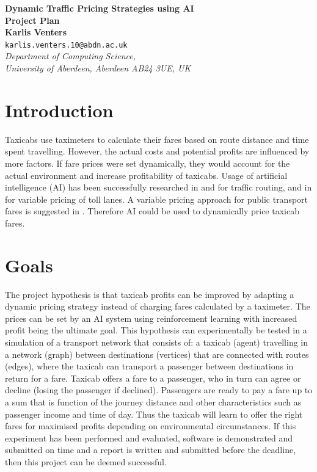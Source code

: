 \documentclass[a4paper,12pt]{article}
\begin{document}
\begin{center}
{\Large\bf{Dynamic Traffic Pricing Strategies using AI}} \\
      \vspace{4.0mm}
{\Large\bf{Project Plan}} \\
      \vspace{6mm}
      {\large\bf{Karlis Venters}}  \\
      \vspace{4.0mm}
       {\tt karlis.venters.10@abdn.ac.uk} \\
      \vspace{4.0mm}
      {\em Department of Computing Science,\\
       University of Aberdeen, Aberdeen AB24 3UE, UK} 
\end{center}


\section*{Introduction}
Taxicabs use taximeters to calculate their fares based on route distance and time spent travelling. However, the actual costs and potential profits are influenced by more factors. If fare prices were set dynamically, they would account for the actual environment and increase profitability of taxicabs. Usage of artificial intelligence (AI) has been successfully researched in \cite{tavares2012reinforcement} and \cite{ben2010road} for traffic routing, and in \cite{lou2011optimal} for variable pricing of toll lanes. A variable pricing approach for public transport fares is suggested in \cite{emele2013agent}. Therefore AI could be used to dynamically price taxicab fares.

\section*{Goals}
The project hypothesis is that taxicab profits can be improved by adapting a dynamic pricing strategy instead of charging fares calculated by a taximeter. The prices can be set by an AI system using reinforcement learning with increased profit being the ultimate goal. This hypothesis can experimentally be tested in a simulation of a transport network that consists of: a taxicab (agent) travelling in a network (graph) between destinations (vertices) that are connected with routes (edges), where the taxicab can transport a passenger between destinations in return for a fare. Taxicab offers a fare to a passenger, who in turn can agree or decline (losing the passenger if declined). Passengers are ready to pay a fare up to a sum that is function of the journey distance and other  characteristics such as passenger income and time of day. Thus the taxicab will learn to offer the right fares for maximised profits depending on environmental circumstances. If this experiment has been performed and evaluated, software is demonstrated and submitted on time and a report is written and submitted before the deadline, then this project can be deemed successful.
\end{document}
